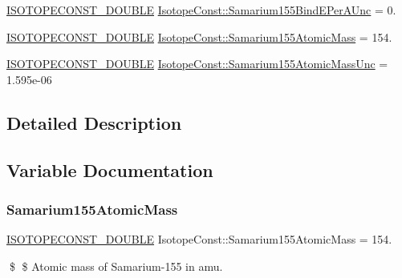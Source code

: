 \begin{DoxyCompactItemize}
\mbox{\hyperlink{group___isotope_const-_macros_ga8f45a7272ce02c0b4c65c44636ed719a}{I\+S\+O\+T\+O\+P\+E\+C\+O\+N\+S\+T\+\_\+\+D\+O\+U\+B\+LE}} \mbox{\hyperlink{group___isotope_const-_samarium-_sm155_gadfca54ccb2c6dc60ea5e20b762d8c8c9}{Isotope\+Const\+::\+Samarium155\+Bind\+E\+Per\+A\+Unc}} = 0.
\item 
\mbox{\hyperlink{group___isotope_const-_macros_ga8f45a7272ce02c0b4c65c44636ed719a}{I\+S\+O\+T\+O\+P\+E\+C\+O\+N\+S\+T\+\_\+\+D\+O\+U\+B\+LE}} \mbox{\hyperlink{group___isotope_const-_samarium-_sm155_gad011cf0a4febd351884786a4e23407c8}{Isotope\+Const\+::\+Samarium155\+Atomic\+Mass}} = 154.
\item 
\mbox{\hyperlink{group___isotope_const-_macros_ga8f45a7272ce02c0b4c65c44636ed719a}{I\+S\+O\+T\+O\+P\+E\+C\+O\+N\+S\+T\+\_\+\+D\+O\+U\+B\+LE}} \mbox{\hyperlink{group___isotope_const-_samarium-_sm155_ga1f21179c850bee1c596be7d78bbfc9af}{Isotope\+Const\+::\+Samarium155\+Atomic\+Mass\+Unc}} = 1.\+595e-\/06
\end{DoxyCompactItemize}


\subsection{Detailed Description}


\subsection{Variable Documentation}
\mbox{\label{group___isotope_const-_samarium-_sm155_gad011cf0a4febd351884786a4e23407c8}} 
\subsubsection{\texorpdfstring{Samarium155\+Atomic\+Mass}{Samarium155AtomicMass}}
{\footnotesize\ttfamily \mbox{\hyperlink{group___isotope_const-_macros_ga8f45a7272ce02c0b4c65c44636ed719a}{I\+S\+O\+T\+O\+P\+E\+C\+O\+N\+S\+T\+\_\+\+D\+O\+U\+B\+LE}} Isotope\+Const\+::\+Samarium155\+Atomic\+Mass = 154.}

\$ \$ Atomic mass of Samarium-\/155 in amu. \mbox{\label{group___isotope_const-_samarium-_sm155_ga1f21179c850bee1c596be7d78bbfc9af}} 

